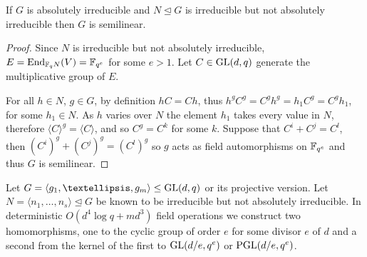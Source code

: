
\begin{Prop}
If $G$ is absolutely irreducible and $N \unlhd G$ is irreducible but not
absolutely irreducible then $G$ is semilinear.
\end{Prop}

\begin{proof}
Since $N$ is irreducible but not absolutely irreducible, $E = \End_{\F_qN}(V) = \F_{q^e}$ for some $e > 1$.
 Let $C \in \GL(d, q)$ generate the multiplicative group of
$E$.

For all $h \in N$, $g \in G$, by definition $hC = Ch$, thus
$h^g C^g = C^g h^g = h_1 C^g = C^g h_1$, for some $h_1 \in N$. As
$h$ varies over $N$ the element $h_1$ takes every value in $N$, therefore
$\langle C \rangle ^g = \langle C \rangle$, and so $C^g = C^k$ for some
 $k$. Suppose that $C^i + C^j = C^l$, 
then $(C^i)^g + (C^j)^g = (C^l)^g$
so $g$ acts as field automorphisms on $\mathbb{F}_{q^e}$ and thus $G$ is
semilinear.
\end{proof}


\begin{Theo} [Recognition of \CC3]
Let $G = \langle g_1, \ldots, g_m \rangle \leq \GL(d, q)$ or its
projective version.
Let $N = \langle n_1, \ldots, n_s \rangle \unlhd G$ be  known 
to be irreducible but not absolutely irreducible. 
In deterministic $O(d^4\log q + m d^3)$ field operations we construct
 two homomorphisms, one to
the cyclic group of order $e$ for some divisor $e$ of $d$ and a second
from the kernel of the
first to $\GL(d/e, q^e)$ or $\PGL(d/e, q^e)$.
\end{Theo} 

